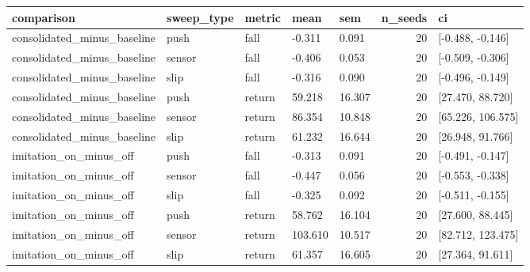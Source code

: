 \begin{tabular}{lllllrl}
\toprule
comparison & sweep\_type & metric & mean & sem & n\_seeds & ci \\
\midrule
consolidated\_minus\_baseline & push & fall & -0.311 & 0.091 & 20 & [-0.488, -0.146] \\
consolidated\_minus\_baseline & sensor & fall & -0.406 & 0.053 & 20 & [-0.509, -0.306] \\
consolidated\_minus\_baseline & slip & fall & -0.316 & 0.090 & 20 & [-0.496, -0.149] \\
consolidated\_minus\_baseline & push & return & 59.218 & 16.307 & 20 & [27.470, 88.720] \\
consolidated\_minus\_baseline & sensor & return & 86.354 & 10.848 & 20 & [65.226, 106.575] \\
consolidated\_minus\_baseline & slip & return & 61.232 & 16.644 & 20 & [26.948, 91.766] \\
imitation\_on\_minus\_off & push & fall & -0.313 & 0.091 & 20 & [-0.491, -0.147] \\
imitation\_on\_minus\_off & sensor & fall & -0.447 & 0.056 & 20 & [-0.553, -0.338] \\
imitation\_on\_minus\_off & slip & fall & -0.325 & 0.092 & 20 & [-0.511, -0.155] \\
imitation\_on\_minus\_off & push & return & 58.762 & 16.104 & 20 & [27.600, 88.445] \\
imitation\_on\_minus\_off & sensor & return & 103.610 & 10.517 & 20 & [82.712, 123.475] \\
imitation\_on\_minus\_off & slip & return & 61.357 & 16.605 & 20 & [27.364, 91.611] \\
\bottomrule
\end{tabular}
